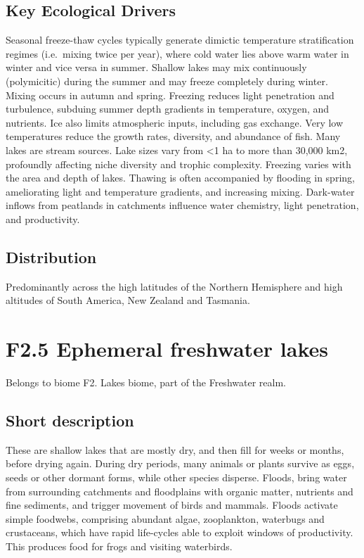 \documentclass[
  letterpaper,
  DIV=11,
  numbers=noendperiod]{scrartcl}
\begin{document}
\subsection{Key Ecological Drivers}\label{key-ecological-drivers-11}

Seasonal freeze-thaw cycles typically generate dimictic temperature
stratification regimes (i.e.~mixing twice per year), where cold water
lies above warm water in winter and vice versa in summer. Shallow lakes
may mix continuously (polymicitic) during the summer and may freeze
completely during winter. Mixing occurs in autumn and spring. Freezing
reduces light penetration and turbulence, subduing summer depth
gradients in temperature, oxygen, and nutrients. Ice also limits
atmospheric inputs, including gas exchange. Very low temperatures reduce
the growth rates, diversity, and abundance of fish. Many lakes are
stream sources. Lake sizes vary from \textless1 ha to more than 30,000
km2, profoundly affecting niche diversity and trophic complexity.
Freezing varies with the area and depth of lakes. Thawing is often
accompanied by flooding in spring, ameliorating light and temperature
gradients, and increasing mixing. Dark-water inflows from peatlands in
catchments influence water chemistry, light penetration, and
productivity.

\subsection{Distribution}\label{distribution-11}

Predominantly across the high latitudes of the Northern Hemisphere and
high altitudes of South America, New Zealand and Tasmania.

\section{F2.5 Ephemeral freshwater
lakes}\label{f2.5-ephemeral-freshwater-lakes}

Belongs to biome F2. Lakes biome, part of the Freshwater realm.

\subsection{Short description}\label{short-description-12}

These are shallow lakes that are mostly dry, and then fill for weeks or
months, before drying again. During dry periods, many animals or plants
survive as eggs, seeds or other dormant forms, while other species
disperse. Floods, bring water from surrounding catchments and
floodplains with organic matter, nutrients and fine sediments, and
trigger movement of birds and mammals. Floods activate simple foodwebs,
comprising abundant algae, zooplankton, waterbugs and crustaceans, which
have rapid life-cycles able to exploit windows of productivity. This
produces food for frogs and visiting waterbirds.
\end{document}
